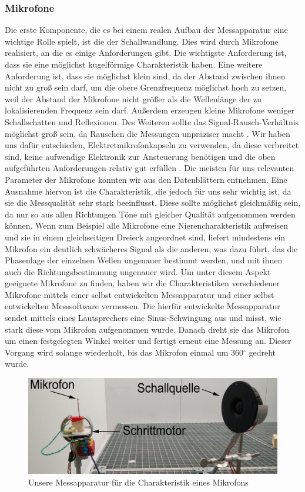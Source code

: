 \subsubsection{Mikrofone}
Die erste Komponente, die es bei einem realen Aufbau der Messapparatur eine wichtige Rolle spielt, ist die der Schallwandlung. Dies wird durch Mikrofone realisiert, an die es einige Anforderungen gibt. Die wichtigste Anforderung ist, dass sie eine möglichst kugelförmige Charakteristik haben.
Eine weitere Anforderung ist, dass sie möglichst klein sind, da der Abstand zwischen ihnen nicht zu groß sein darf, um die obere Grenzfrequenz möglichst hoch zu setzen, weil der Abstand der Mikrofone nicht größer als die Wellenlänge der zu lokalisierenden Frequenz sein darf. Außerdem erzeugen kleine Mikrofone weniger Schallschatten und Reflexionen. Des Weiteren sollte das Signal-Rausch-Verhältnis möglichst groß sein, da Rauschen die Messungen unpräziser macht \cite{Rausch}.
Wir haben uns dafür entschieden, Elektretmikrofonkapseln zu verwenden, da diese verbreitet sind, keine aufwendige Elektronik zur Ansteuerung benötigen und die oben aufgeführten Anforderungen relativ gut erfüllen \cite{elektret}.
Die meisten für uns relevanten Parameter der Mikrofone konnten wir aus den Datenblättern entnehmen. Eine Ausnahme hiervon ist die Charakteristik, die jedoch für uns sehr wichtig ist, da sie die Messqualität sehr stark beeinflusst. Diese sollte möglichst gleichmäßig sein, da nur so aus allen Richtungen Töne mit gleicher Qualität aufgenommen werden können. Wenn zum Beispiel alle Mikrofone eine Nierencharakteristik aufweisen und sie in einem gleichseitigen Dreieck angeordnet sind, liefert mindestens ein Mikrofon ein deutlich schwächeres Signal als die anderen, was dazu führt, das die Phasenlage der einzelnen Wellen ungenauer bestimmt werden, und mit ihnen auch die Richtungsbestimmung ungenauer wird.
Um unter diesem Aspekt geeignete Mikrofone zu finden, haben wir die Charakteristiken verschiedener Mikrofone mittels einer selbst entwickelten Messapparatur und einer selbst entwickelten Messsoftware vermessen. Die hierfür entwickelte Messapparatur sendet mittels eines Lautsprechers eine Sinus-Schwingung aus und misst, wie stark diese vom Mikrofon aufgenommen wurde. Danach dreht sie das Mikrofon um einen festgelegten Winkel weiter und fertigt erneut eine Messung an. Dieser Vorgang wird solange wiederholt, bis das Mikrofon einmal um 360$^{\circ}$ gedreht wurde.
\begin{figure}[H]
  \centering
  \includegraphics[width=0.8\linewidth]{img/chara_mess}
  \caption{Unsere Messapparatur für die Charakteristik eines Mikrofons}
\end{figure}
